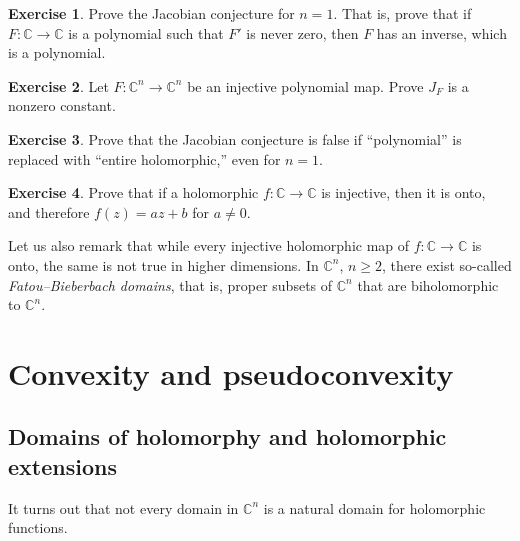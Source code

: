 \documentclass[12pt,openany]{book}
\newcommand{\C}{{\mathbb{C}}}
\theoremstyle{plain}
\theoremstyle{remark}
\theoremstyle{definition}
\newenvironment{exbox}{%
    \def\FrameCommand{\vrule width 1pt \relax\hspace{10pt}}%
    \MakeFramed {\advance \hsize -\width \FrameRestore}%
}{%
    \endMakeFramed
}
\theoremstyle{exercise}
\newtheorem{exercise}{Exercise}[section]
\theoremstyle{example}
\begin{document}
\begin{exbox}
\begin{exercise}
Prove the Jacobian conjecture for $n=1$.  That is, prove that if
$F \colon \C \to \C$ is a polynomial such that $F'$ is never zero,
then $F$ has an inverse, which is a polynomial.
\end{exercise}

\begin{exercise}
Let $F \colon \C^n \to \C^n$ be an injective polynomial map.
Prove $J_F$ is a nonzero constant.
\end{exercise}

\begin{exercise}
Prove that the Jacobian conjecture is false if
``polynomial'' is replaced with ``entire holomorphic,'' even for $n=1$.
\end{exercise}

\begin{exercise}
Prove that if a holomorphic $f \colon \C \to \C$ is injective, then it is
onto, and therefore $f(z) = az + b$ for $a \not= 0$.
\end{exercise}
\end{exbox}

Let us also remark that while every injective holomorphic
map of $f \colon \C \to \C$ is onto, the same is not true in higher
dimensions.
In $\C^n$, $n \geq 2$, there exist so-called
\emph{Fatou--Bieberbach domains},
that is, proper subsets of $\C^n$ that are biholomorphic to $\C^n$.



\chapter{Convexity and pseudoconvexity} \label{ch:convexity}


\section{Domains of holomorphy and holomorphic extensions}

It turns out that not every domain in $\C^n$ is a natural domain for
holomorphic functions.
\end{document}
